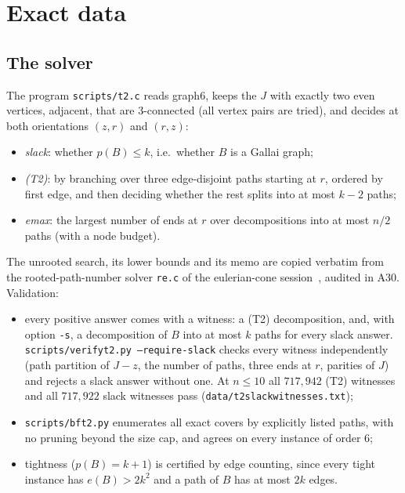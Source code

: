 \documentclass[11pt]{amsart}
\theoremstyle{definition}
\theoremstyle{remark}
\renewcommand{\_}{\oldunderscore\allowbreak}
\begin{document}
\section{Exact data}\label{sec:data}

\subsection{The solver} The program \texttt{scripts/t2.c} reads graph6, keeps the $J$ with exactly
two even vertices, adjacent, that are $3$-connected (all vertex pairs are tried), and decides at
both orientations $(z,r)$ and $(r,z)$:
\begin{itemize}[leftmargin=*]
\item \emph{slack}: whether $p(B)\le k$, i.e.\ whether $B$ is a Gallai graph;
\item \emph{(T2)}: by branching over three edge-disjoint paths starting at $r$, ordered by first
edge, and then deciding whether the rest splits into at most $k-2$ paths;
\item \emph{emax}: the largest number of ends at $r$ over decompositions into at most $n/2$ paths
(with a node budget).
\end{itemize}
The unrooted search, its lower bounds and its memo are copied verbatim from the rooted-path-number
solver \texttt{re.c} of the eulerian-cone session~\cite{EC}, audited in A30. Validation:
\begin{itemize}[leftmargin=*]
\item every positive answer comes with a witness: a (T2) decomposition, and, with option
\texttt{-s}, a decomposition of $B$ into at most $k$ paths for every slack answer.
\texttt{scripts/verify\_t2.py --require-slack} checks every witness independently (path partition of
$J-z$, the number of paths, three ends at $r$, parities of $J$) and rejects a slack answer without
one. At $n\le10$ all $717{,}942$ (T2) witnesses and all $717{,}922$ slack witnesses pass
(\texttt{data/t2\_slack\_witnesses.txt});
\item \texttt{scripts/bf\_t2.py} enumerates all exact covers by explicitly listed paths, with no
pruning beyond the size cap, and agrees on every instance of order $6$;
\item tightness ($p(B)=k+1$) is certified by edge counting, since every tight instance has
$e(B)>2k^2$ and a path of $B$ has at most $2k$ edges.
\end{itemize}
\end{document}
